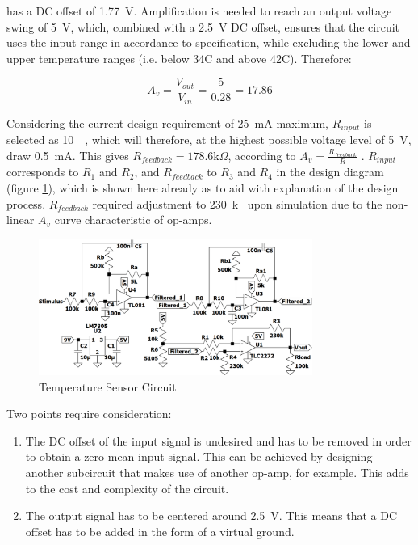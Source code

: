 has a DC offset of \SI{1.77}{\volt}. Amplification is needed to reach an output voltage swing of \SI{5}{\volt}, which, combined with a \SI{2.5}{V} DC offset, ensures that the circuit uses the input range in accordance to specification, while excluding the lower and upper temperature ranges (i.e. below 34\degree C and above 42\degree C). Therefore:

$$A_v = \frac{V_{out}}{V_{in}} = \frac{5}{0.28} = 17.86$$

Considering the current design requirement of \SI{25}{mA} maximum, $R_{input}$ is selected as \SI{10}{\kilo \Omega}, which will therefore, at the highest possible voltage level of \SI{5}{\volt}, draw \SI{0.5}{mA}. This gives $R_{feedback} = 178.6$k$\Omega$, according to $A_v = \frac{{R}_{feedback}}{R}$ \cite{opamp}. $R_{input}$ corresponds to $R_1$ and $R_2$, and $R_{feedback}$ to $R_{3}$ and $R_4$ in the design diagram (figure \ref{fig:final}), which is shown here already as to aid with explanation of the design process. $R_{feedback}$ required adjustment to \SI{230}{k\Omega} upon simulation due to the non-linear $A_v$ curve characteristic of op-amps.

\begin{figure}[H]
    \centering
    \includegraphics[width = 0.8\textwidth]{Figures/final.png}
    \caption{Temperature Sensor Circuit}
    \label{fig:final}
\end{figure}

Two points require consideration: 
\begin{enumerate}
\item The DC offset of the input signal is undesired and has to be removed in order to obtain a zero-mean input signal. This can be achieved by designing another subcircuit that makes use of another op-amp, for example. This adds to the cost and complexity of the circuit.
\item The output signal has to be centered around \SI{2.5}{\volt}. This means that a DC offset has to be added in the form of a virtual ground.
\end{enumerate}

